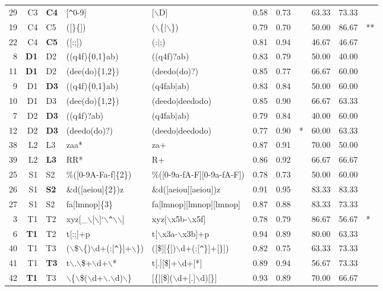 \begin{table*}[ht]
\begin{tabular}{rr@{ -- }lllrrlrrl}
  29 & C3 & {\bf C4} & [\verb|^|0-9] & [$\backslash$D] & 0.58 & 0.73 &   & 63.33 & 73.33 &   \\ 
  19 & C4 & C5 & ([\}\{]) & ($\backslash$\{$|$$\backslash$\}) & 0.79 & 0.70 &   & 50.00 & 86.67 & ** \\ 
  22 & C4 & {\bf C5} & ([:;]) & (:$|$;) & 0.81 & 0.94 &   & 46.67 & 46.67 &   \\ 
  \hline
  8 & {\bf D1} & D2 & ((q4f)\{0,1\}ab) & ((q4f)?ab) & 0.83 & 0.79 &   & 50.00 & 40.00 &   \\ 
  11 & {\bf D1} & D2 & (dee(do)\{1,2\}) & (deedo(do)?) & 0.85 & 0.77 &   & 66.67 & 60.00 &   \\ 
  9 & D1 & {\bf D3} & ((q4f)\{0,1\}ab) & (q4fab$|$ab) & 0.83 & 0.84 &   & 50.00 & 60.00 &   \\ 
  10 & D1 & D3 & (dee(do)\{1,2\}) & (deedo$|$deedodo) & 0.85 & 0.90 &   & 66.67 & 63.33 &   \\ 

  7 & D2 & {\bf D3} & ((q4f)?ab) & (q4fab$|$ab) & 0.79 & 0.84 &   & 40.00 & 60.00 &   \\ 
  12 & D2 & {\bf D3} & (deedo(do)?) & (deedo$|$deedodo) & 0.77 & 0.90 & * & 60.00 & 63.33 &   \\ 
  \hline
  38 & L2 & L3 & zaa* & za+ & 0.87 & 0.91 &   & 70.00 & 50.00 &   \\ 
  39 & L2 & {\bf L3} & RR* & R+ & 0.86 & 0.92 &   & 66.67 & 66.67 &   \\ 
  \hline
  25 & S1 & S2 & \%([0-9A-Fa-f]\{2\}) & \%([0-9a-fA-F][0-9a-fA-F]) & 0.78 & 0.73 &   & 50.00 & 60.00 &   \\ 
  26 & S1 & {\bf S2} & \&d([aeiou]\{2\})z & \&d([aeiou][aeiou])z & 0.91 & 0.95 &   & 83.33 & 83.33 &   \\ 
  27 & S1 & S2 & fa[lmnop]\{3\} & fa[lmnop][lmnop][lmnop] & 0.87 & 0.88 &   & 83.33 & 73.33 &   \\ 
  \hline
  3 & T1 & T2 & xyz[\_$\backslash$[$\backslash$]`$\backslash$\verb|^|$\backslash$$\backslash$] & xyz[$\backslash$x5b-$\backslash$x5f] & 0.78 & 0.79 &   & 86.67 & 56.67 & * \\ 
  6 & {\bf T1} & T2 & t[:;]+p & t[$\backslash$x3a-$\backslash$x3b]+p & 0.94 & 0.89 &   & 80.00 & 63.33 &   \\ 
  
  40 & T1 & T3 & ($\backslash$\$$\backslash$\{)$\backslash$d+(:[\verb|^|\}]+$\backslash$\}) & ([\$][\{])$\backslash$d+(:[\verb|^|\}]+[\}]) & 0.82 & 0.75 &   & 63.33 & 73.33 &   \\ 
  41 & T1 & {\bf T3} & t$\backslash$.$\backslash$\$+$\backslash$d+$\backslash$* & t[.][\$]+$\backslash$d+[*] & 0.89 & 0.94 &   & 56.67 & 73.33 &   \\ 
  42 & {\bf T1} & T3 & $\backslash$\{$\backslash$\$($\backslash$d+$\backslash$.$\backslash$d)$\backslash$\} & [\{][\$]($\backslash$d+[.]$\backslash$d)[\}] & 0.93 & 0.89 &   & 70.00 & 66.67 &   \\ 
  

\end{tabular}
\end{table*}
